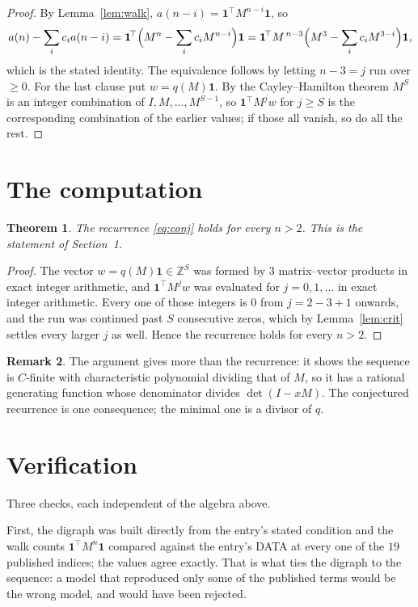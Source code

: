 \documentclass[11pt,a4paper]{article}
\theoremstyle{plain}
\newtheorem{theorem}{Theorem}
\theoremstyle{definition}
\newtheorem{remark}[theorem]{Remark}
\begin{document}
\begin{proof}
By Lemma~\ref{lem:walk}, $a(n-i)=\mathbf{1}^{\!\top}M^{n-i}\mathbf{1}$, so
\[
a(n)-\sum_i c_i a(n-i)
=\mathbf{1}^{\!\top}\Bigl(M^{n}-\sum_i c_i M^{n-i}\Bigr)\mathbf{1}
=\mathbf{1}^{\!\top}M^{\,n-3}\Bigl(M^{3}-\sum_i c_i M^{3-i}\Bigr)\mathbf{1},
\]
which is the stated identity. The equivalence follows by letting $n-3=j$ run over
$\ge0$. For the last clause put $w=q(M)\mathbf{1}$. By the Cayley--Hamilton theorem
$M^{S}$ is an integer combination of $I,M,\dots,M^{S-1}$, so
$\mathbf{1}^{\!\top}M^{j}w$ for $j\ge S$ is the corresponding combination of the
earlier values; if those all vanish, so do all the rest.
\end{proof}

\section{The computation}

\begin{theorem}
The recurrence \eqref{eq:conj} holds for every $n>2$. This is the statement of
Section~1.
\end{theorem}

\begin{proof}
The vector $w=q(M)\mathbf{1}\in\mathbb{Z}^{S}$ was formed by $3$ matrix--vector
products in exact integer arithmetic, and $\mathbf{1}^{\!\top}M^{j}w$ was evaluated for
$j=0,1,\dots$ in exact integer arithmetic. Every one of those integers is $0$ from
$j=2-3+1$ onwards, and the run was continued past $S$ consecutive zeros, which by
Lemma~\ref{lem:crit} settles every larger $j$ as well. Hence the recurrence holds for
every $n>2$.
\end{proof}

\begin{remark}
The argument gives more than the recurrence: it shows the sequence is $C$-finite with
characteristic polynomial dividing that of $M$, so it has a rational generating function
whose denominator divides $\det(I-xM)$. The conjectured recurrence is one consequence; the
minimal one is a divisor of $q$.
\end{remark}

\section{Verification}

Three checks, each independent of the algebra above.

First, the digraph was built directly from the entry's stated condition and the walk counts
$\mathbf{1}^{\!\top}M^{n}\mathbf{1}$ compared against the entry's DATA at every one of
the $19$ published indices; the values agree exactly. That is what ties the digraph to
the sequence: a model that reproduced only some of the published terms would be the wrong
model, and would have been rejected.
\end{document}
